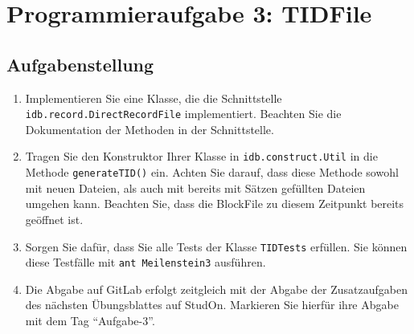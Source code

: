 \section{Programmieraufgabe 3: TIDFile}

\subsection{Aufgabenstellung}
\begin{enumerate}
	\item Implementieren Sie eine Klasse, die die Schnittstelle \beamertxt{\linebreak}\texttt{idb.record.DirectRecordFile} implementiert.
		Beachten Sie die Dokumentation der Methoden in der Schnittstelle.
	\item Tragen Sie den Konstruktor Ihrer Klasse in \texttt{idb.construct.Util} in die Methode \texttt{generateTID()} ein. Achten Sie darauf, dass diese Methode sowohl mit neuen Dateien, als auch mit bereits mit Sätzen gefüllten Dateien umgehen kann.
		Beachten Sie, dass die BlockFile zu diesem Zeitpunkt bereits geöffnet ist.
	\item Sorgen Sie dafür, dass Sie alle Tests der Klasse \texttt{TIDTests} erfüllen.
	Sie können diese Testfälle mit \lstinline|ant Meilenstein3| ausführen.
	\item Die Abgabe auf GitLab erfolgt zeitgleich mit der Abgabe der Zusatzaufgaben des nächsten Übungsblattes auf StudOn. Markieren Sie hierfür ihre Abgabe mit dem Tag "`Aufgabe-3"'.
\end{enumerate}

